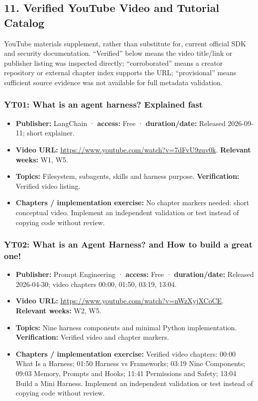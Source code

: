 \documentclass[
  10pt,
]{article}
\providecommand{\tightlist}{%
  \setlength{\itemsep}{0pt}\setlength{\parskip}{0pt}}
\begin{document}
\subsection{11. Verified YouTube Video and Tutorial
Catalog}\label{verified-youtube-video-and-tutorial-catalog}

YouTube materials supplement, rather than substitute for, current
official SDK and security documentation. ``Verified'' below means the
video title/link or publisher listing was inspected directly;
``corroborated'' means a creator repository or external chapter index
supports the URL; ``provisional'' means sufficient source evidence was
not available for full metadata validation.

\subsubsection{YT01: What is an agent harness? Explained
fast}\label{yt01-what-is-an-agent-harness-explained-fast}

\begin{itemize}
\tightlist
\item
  \textbf{Publisher:} LangChain · \textbf{access:} Free ·
  \textbf{duration/date:} Released 2026-09-11; short explainer.
\item
  \textbf{Video URL:} \url{https://www.youtube.com/watch?v=7dFvU9zuv0k}.
  \textbf{Relevant weeks:} W1, W5.
\item
  \textbf{Topics:} Filesystem, subagents, skills and harness purpose.
  \textbf{Verification:} Verified video listing.
\item
  \textbf{Chapters / implementation exercise:} No chapter markers
  needed: short conceptual video. Implement an independent validation or
  test instead of copying code without review.
\end{itemize}

\subsubsection{YT02: What is an Agent Harness? and How to build a great
one!}\label{yt02-what-is-an-agent-harness-and-how-to-build-a-great-one}

\begin{itemize}
\tightlist
\item
  \textbf{Publisher:} Prompt Engineering · \textbf{access:} Free ·
  \textbf{duration/date:} Released 2026-04-30; video chapters 00:00,
  01:50, 03:19, 13:04.
\item
  \textbf{Video URL:} \url{https://www.youtube.com/watch?v=nWzXyjXCoCE}.
  \textbf{Relevant weeks:} W2, W5.
\item
  \textbf{Topics:} Nine harness components and minimal Python
  implementation. \textbf{Verification:} Verified video and chapter
  markers.
\item
  \textbf{Chapters / implementation exercise:} Verified video chapters:
  00:00 What Is a Harness; 01:50 Harness vs Frameworks; 03:19 Nine
  Components; 09:03 Memory, Prompts and Hooks; 11:41 Permissions and
  Safety; 13:04 Build a Mini Harness. Implement an independent
  validation or test instead of copying code without review.
\end{itemize}
\end{document}
